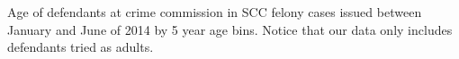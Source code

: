 Age of defendants at crime commission in SCC felony cases issued between January and June of 2014 by 5 year age bins. Notice that our data only includes defendants tried as adults.
\label{fig:AgeBreakdown}